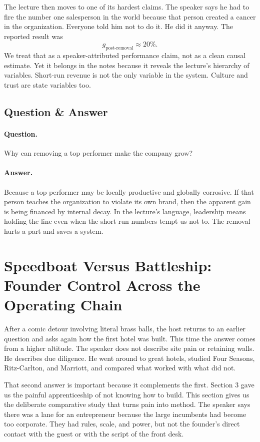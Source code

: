 The lecture then moves to one of its hardest claims. The speaker says he had to fire the number one salesperson in the world because that person created a cancer in the organization. Everyone told him not to do it. He did it anyway. The reported result was
\begin{equation}
g_{\mathrm{post\text{-}removal}}\approx 20\%.
\end{equation}
We treat that as a speaker-attributed performance claim, not as a clean causal estimate. Yet it belongs in the notes because it reveals the lecture's hierarchy of variables. Short-run revenue is not the only variable in the system. Culture and trust are state variables too.

\subsection{Question \& Answer}

\paragraph{Question.}
Why can removing a top performer make the company grow?

\paragraph{Answer.}
Because a top performer may be locally productive and globally corrosive. If that person teaches the organization to violate its own brand, then the apparent gain is being financed by internal decay. In the lecture's language, leadership means holding the line even when the short-run numbers tempt us not to. The removal hurts a part and saves a system.

\section{Speedboat Versus Battleship: Founder Control Across the Operating Chain}

After a comic detour involving literal brass balls, the host returns to an earlier question and asks again how the first hotel was built. This time the answer comes from a higher altitude. The speaker does not describe site pain or retaining walls. He describes due diligence. He went around to great hotels, studied Four Seasons, Ritz-Carlton, and Marriott, and compared what worked with what did not.

That second answer is important because it complements the first. Section 3 gave us the painful apprenticeship of not knowing how to build. This section gives us the deliberate comparative study that turns pain into method. The speaker says there was a lane for an entrepreneur because the large incumbents had become too corporate. They had rules, scale, and power, but not the founder's direct contact with the guest or with the script of the front desk.

